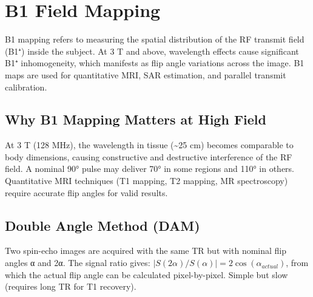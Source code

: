 \section{B1 Field Mapping}\label{sec:wiki_b1_mapping}



B1 mapping refers to measuring the spatial distribution of the RF transmit field (B1⁺) inside the subject. At 3 T and above, wavelength effects cause significant B1⁺ inhomogeneity, which manifests as flip angle variations across the image. B1 maps are used for quantitative MRI, SAR estimation, and parallel transmit calibration.

				

\subsection{Why B1 Mapping Matters at High Field}

				


				

At 3 T (128 MHz), the wavelength in tissue (\textasciitilde{}25 cm) becomes comparable to body dimensions, causing constructive and destructive interference of the RF field. A nominal 90° pulse may deliver 70° in some regions and 110° in others. Quantitative MRI techniques (T1 mapping, T2 mapping, MR spectroscopy) require accurate flip angles for valid results.


				

\subsection{Double Angle Method (DAM)}

				

Two spin-echo images are acquired with the same TR but with nominal flip angles α and 2α. The signal ratio gives: $|S(2\alpha)/S(\alpha)| = 2\cos(\alpha_{actual})$, from which the actual flip angle can be calculated pixel-by-pixel. Simple but slow (requires long TR for T1 recovery).

				

